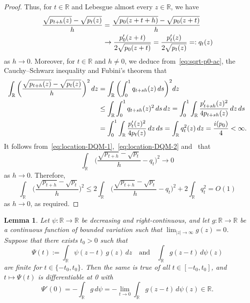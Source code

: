 \documentclass[a4paper]{article}
\newcommand{\R}{\mathbb{R}}
\newtheorem{lemma}[theorem]{Lemma}
\theoremstyle{definition}
\begin{document}
\begin{proof}
Thus, for $t \in \R$ and Lebesgue almost every $z \in \R$, we have
\begin{align}
\label{eq:location-DQM-1}
\frac{\sqrt{p_{t + h}(z)} - \sqrt{p_t(z)}}{h} &= \frac{\sqrt{p_0(z + t + h)} - \sqrt{p_0(z + t)}}{h} \notag \\
&\to \frac{p_0'(z + t)}{2\sqrt{p_0(z + t)}} = \frac{p_t'(z)}{2\sqrt{p_t(z)}} =: q_t(z)
\end{align}
as $h \to 0$. Moreover, for $t \in \R$ and $h \neq 0$, we deduce from~\eqref{eq:sqrt-p0-ac}, the Cauchy--Schwarz inequality and Fubini's theorem that
\begin{align}
\int_\R \,\biggl(\frac{\sqrt{p_{t + h}(z)} - \sqrt{p_t(z)}}{h}\biggr)^2\,dz &= \int_\R \,\biggl(\int_0^1 q_{t + sh}(z)\,ds\biggr)^2 dz \notag \\
&\leq \int_\R \int_0^1 q_{t + sh}(z)^2\,ds\,dz = \int_0^1 \int_\R \frac{p_{t + sh}'(z)^2}{4p_{t + sh}(z)}\,dz\,ds \notag \\
\label{eq:location-DQM-2}
&= \int_0^1 \int_\R \frac{p_t'(z)^2}{4p_t(z)}\,dz\,ds = \int_\R q_t^2(z)\,dz = \frac{i(p_0)}{4} < \infty.
\end{align}
It follows from~\eqref{eq:location-DQM-1},~\eqref{eq:location-DQM-2} and~\citet[Proposition~2.29]{vdV1998asymptotic} that 
\[
\int_\R \,\biggl(\frac{\sqrt{p_{t + h}} - \sqrt{p_t}}{h} - q_t\biggr)^2 \to 0
\]
as $h \to 0$. Therefore,
\[
\int_\R \,\biggl(\frac{\sqrt{p_{t + h}} - \sqrt{p_t}}{h}\biggr)^2 \leq 2\int_\R \,\biggl(\frac{\sqrt{p_{t + h}} - \sqrt{p_t}}{h} - q_t\biggr)^2 + 2\int_\R q_t^2 = O(1)
\]
as $h \to 0$, as required.
\end{proof}

\begin{lemma}
\label{lem:Psi-deriv}
Let $\psi \colon \R \to \R$ be decreasing and right-continuous, and let $g \colon \R \to \R$ be a continuous function of bounded variation such that $\lim_{|z| \to \infty} g(z) = 0$. Suppose that there exists $t_0 > 0$ such that 
\[
\varPsi(t) := \int_\R \psi(z - t)\,g(z)\,dz \quad\text{and}\quad \int_\R g(z - t)\,d\psi(z)
\]
are finite for $t \in \{-t_0, t_0\}$. Then 
the same is true of all $t \in [-t_0,t_0]$, and $t \mapsto \varPsi(t)$ is differentiable at 0 with
\[
\varPsi'(0) = -\int_\R g\,d\psi = -\lim_{t \to 0} \int_\R g(z - t)\,d\psi(z) \in \mathbb{R}.
\]
\end{lemma}
\end{document}
